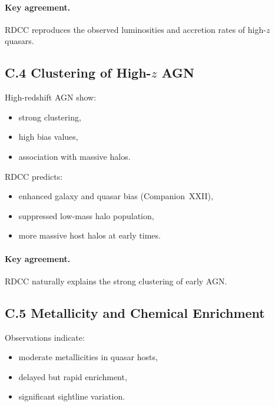 \documentclass[11pt,a4paper]{article}
\begin{document}
\paragraph{Key agreement.}
RDCC reproduces the observed luminosities and accretion rates of high-$z$ quasars.

\subsection*{C.4 Clustering of High-$z$ AGN}

High-redshift AGN show:

\begin{itemize}
    \item strong clustering,
    \item high bias values,
    \item association with massive halos.
\end{itemize}

RDCC predicts:

\begin{itemize}
    \item enhanced galaxy and quasar bias (Companion~XXII),
    \item suppressed low-mass halo population,
    \item more massive host halos at early times.
\end{itemize}

\paragraph{Key agreement.}
RDCC naturally explains the strong clustering of early AGN.

\subsection*{C.5 Metallicity and Chemical Enrichment}

Observations indicate:

\begin{itemize}
    \item moderate metallicities in quasar hosts,
    \item delayed but rapid enrichment,
    \item significant sightline variation.
\end{itemize}
\end{document}
